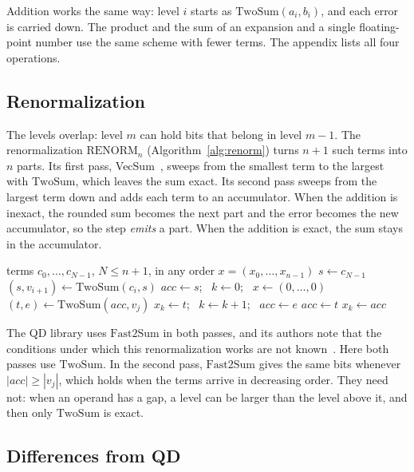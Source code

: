 \documentclass[conference]{IEEEtran}
\theoremstyle{definition}
\theoremstyle{remark}
\newcommand{\acc}{\mathit{acc}}
\newcommand{\TwoSum}{\mathrm{TwoSum}}
\newcommand{\FastTwoSum}{\mathrm{Fast2Sum}}
\newcommand{\Ren}{\mathrm{RENORM}}
\begin{document}
Addition works the same way: level $i$ starts as $\TwoSum(a_i, b_i)$, and each error is carried down. The product and
the sum of an expansion and a single floating-point number use the same scheme with fewer terms. The appendix lists
all four operations.

\subsection{Renormalization}

The levels overlap: level $m$ can hold bits that belong in level $m - 1$. The renormalization $\Ren_n$
(Algorithm~\ref{alg:renorm}) turns $n + 1$ such terms into $n$ parts. Its first pass, VecSum~\cite{ORO05}, sweeps
from the smallest term to the largest with $\TwoSum$, which leaves the sum exact. Its second pass sweeps from the
largest term down and adds each term to an accumulator. When the addition is inexact, the rounded sum becomes the next
part and the error becomes the new accumulator, so the step \emph{emits} a part. When the addition is exact, the sum
stays in the accumulator.

\nopagebreak
\begin{algorithm}[H]
\caption{Renormalization $\Ren_n$}\label{alg:renorm}
\small
\begin{algorithmic}[1]
\Require terms $c_0, \dots, c_{N-1}$, $N \le n + 1$, in any order
\Ensure $x = (x_0, \dots, x_{n-1})$
\State $s \gets c_{N-1}$
 
  \State $(s, v_{i+1}) \gets \TwoSum(c_i, s)$
\EndFor
\State $\acc \gets s$; \ $k \gets 0$; \ $x \gets (0, \dots, 0)$
  \State $(t, e) \gets \TwoSum(\acc, v_j)$
   
    \State $x_k \gets t$; \ $k \gets k + 1$; \ $\acc \gets e$
  \Else
    \State $\acc \gets t$
  \EndIf
\EndFor
\State $x_k \gets \acc$
\end{algorithmic}
\end{algorithm}

The QD library uses $\FastTwoSum$ in both passes, and its authors note that the conditions under which this
renormalization works are not known~\cite{HLB01}. Here both passes use $\TwoSum$. In the second pass, $\FastTwoSum$
gives the same bits whenever $|\acc| \ge |v_j|$, which holds when the terms arrive in decreasing order. They need not:
when an operand has a gap, a level can be larger than the level above it, and then only $\TwoSum$ is exact.

\subsection{Differences from QD}\label{sec:qd}
\end{document}
